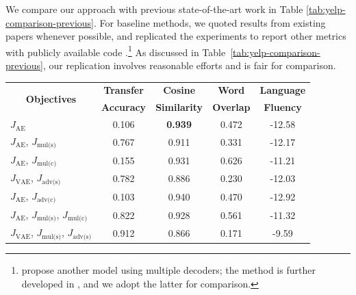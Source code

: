 \documentclass[letterpaper]{article} %
\newcommand{\tabh}[1]{\multicolumn{1}{c|}{\textbf{#1}}}
\newcommand{\tabc}[2]{\multicolumn{1}{|c||}{\multirow{#1}{*}{\textbf{#2}}}}
\newcommand{\loss}[1]{J_{\text{#1}}}
\begin{document}
We compare our approach with previous state-of-the-art work in Table \ref{tab:yelp-comparison-previous}.
For baseline methods, we quoted results from existing papers whenever possible, and replicated the experiments to report other metrics with publicly available code \cite{shen2017style,fu2018style,zhao2018adversarially}.\footnote{\citet{fu2018style} propose another model using multiple decoders; the method is further developed in \citet{zhao2018adversarially}, and we adopt the latter for comparison.} As discussed in Table~\ref{tab:yelp-comparison-previous}, our replication involves reasonable efforts and is fair for comparison.

\begin{table}[ht]
	\centering\vspace{-.2cm}
	\begin{tabular}{| l || c | c | c | c |}
		\hline
		\tabc{2}{Objectives}                                                             & \tabh{Transfer} & \tabh{Cosine}     & \tabh{Word}    & \tabh{Language} \\
		                                                                                 & \tabh{Accuracy} & \tabh{Similarity} & \tabh{Overlap} & \tabh{Fluency}  \\
		\hline
		\hline
		$\loss{AE}$                                                                      & 0.106           & \textbf{0.939}    & 0.472          & -12.58          \\
		\hline
		$\loss{AE}$, $\loss{mul(s)}$                                                     & 0.767           & 0.911             & 0.331          & -12.17          \\
		\hline
		$\loss{AE}$, $\loss{mul(c)}$                                                     & 0.155           & 0.931             & 0.626          & -11.21          \\
		\hline
		$\loss{VAE}$, $\loss{adv(s)}$                                                    & 0.782           & 0.886             & 0.230          & -12.03          \\
		\hline
		$\loss{AE}$, $\loss{adv(c)}$                                                     & 0.103           & 0.940             & 0.470          & -12.92          \\
		\hline
		$\loss{AE}$, $\loss{mul(s)}$, $\loss{mul(c)}$                                    & 0.822           & 0.928             & 0.561          & -11.32          \\
		\hline
		$\loss{VAE}$, $\loss{mul(s)}$, $\loss{adv(s)}$                                   & 0.912           & 0.866             & 0.171          & -9.59           \\

\end{tabular}
\end{table}
\end{document}
